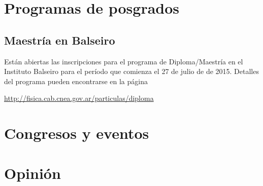 \documentclass{book}
\begin{document}
       \section*{Programas de posgrados}

\subsection{Maestría en Balseiro}
Están abiertas las inscripciones para el programa de Diploma/Maestría en el Instituto Balseiro para el período que comienza el 27 de julio de de 2015. Detalles del programa pueden encontrarse en la página

\url{http://fisica.cab.cnea.gov.ar/particulas/diploma}


\section*{Congresos y eventos}



\section*{Opinión}






\end{document}
